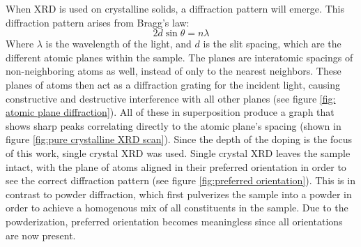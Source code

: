     When XRD is used on crystalline solids, a diffraction pattern will emerge. 
    This diffraction pattern arises from Bragg's law:
    \begin{equation}
        2d\sin\theta=n\lambda
        \label{eq: Bragg}
    \end{equation}
    Where $\lambda$ is the wavelength of the light, %
    and $d$ is the slit spacing, which are the different atomic planes within the sample. %
    The planes are interatomic spacings of non-neighboring atoms as well, instead of only to the nearest neighbors.
    These planes of atoms then act as a diffraction grating for the incident light, causing constructive and destructive interference with all other planes (see figure \ref{fig: atomic plane diffraction}).
    All of these in superposition produce a graph that shows sharp peaks correlating directly to the atomic plane's spacing (shown in figure \ref{fig:pure crystalline XRD scan}). 
    Since the depth of the doping is the focus of this work, single crystal XRD was used. 
    Single crystal XRD leaves the sample intact, with the plane of atoms aligned in their preferred orientation\cite{pandey_structural_2021} in order to see the correct diffraction pattern (see figure \ref{fig:preferred orientation}). 
    This is in contrast to powder diffraction, which first pulverizes the sample into a powder in order to achieve a homogenous mix of all constituents in the sample. 
    Due to the powderization, preferred orientation becomes meaningless since all orientations are now present. 

